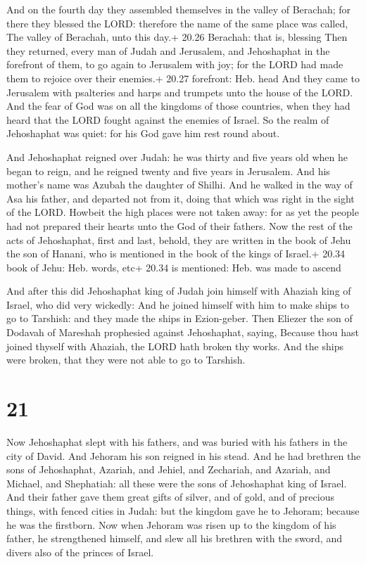  And on the fourth day they assembled themselves in the
valley of Berachah; for there they blessed the LORD: therefore the name
of the same place was called, The valley of Berachah, unto this day.+
20.26 Berachah: that is, blessing  Then they returned,
every man of Judah and Jerusalem, and Jehoshaphat in the forefront of
them, to go again to Jerusalem with joy; for the LORD had made them to
rejoice over their enemies.+ 20.27 forefront: Heb. head 
And they came to Jerusalem with psalteries and harps and trumpets unto
the house of the LORD.  And the fear of God was on all the
kingdoms of those countries, when they had heard that the LORD fought
against the enemies of Israel.  So the realm of Jehoshaphat
was quiet: for his God gave him rest round about.

 And Jehoshaphat reigned over Judah: he was thirty and
five years old when he began to reign, and he reigned twenty and five
years in Jerusalem. And his mother's name was Azubah the daughter of
Shilhi.  And he walked in the way of Asa his father, and
departed not from it, doing that which was right in the sight of the
LORD.  Howbeit the high places were not taken away: for as
yet the people had not prepared their hearts unto the God of their
fathers.  Now the rest of the acts of Jehoshaphat, first
and last, behold, they are written in the book of Jehu the son of
Hanani, who is mentioned in the book of the kings of Israel.+ 20.34 book
of Jehu: Heb. words, etc+ 20.34 is mentioned: Heb. was made to ascend

 And after this did Jehoshaphat king of Judah join
himself with Ahaziah king of Israel, who did very wickedly:
 And he joined himself with him to make ships to go to
Tarshish: and they made the ships in Ezion-geber.  Then
Eliezer the son of Dodavah of Mareshah prophesied against Jehoshaphat,
saying, Because thou hast joined thyself with Ahaziah, the LORD hath
broken thy works. And the ships were broken, that they were not able to
go to Tarshish.

\hypertarget{section-20}{%
\section{21}\label{section-20}}

 Now Jehoshaphat slept with his fathers, and was buried with
his fathers in the city of David. And Jehoram his son reigned in his
stead.  And he had brethren the sons of Jehoshaphat,
Azariah, and Jehiel, and Zechariah, and Azariah, and Michael, and
Shephatiah: all these were the sons of Jehoshaphat king of Israel.
 And their father gave them great gifts of silver, and of
gold, and of precious things, with fenced cities in Judah: but the
kingdom gave he to Jehoram; because he was the firstborn. 
Now when Jehoram was risen up to the kingdom of his father, he
strengthened himself, and slew all his brethren with the sword, and
divers also of the princes of Israel.

